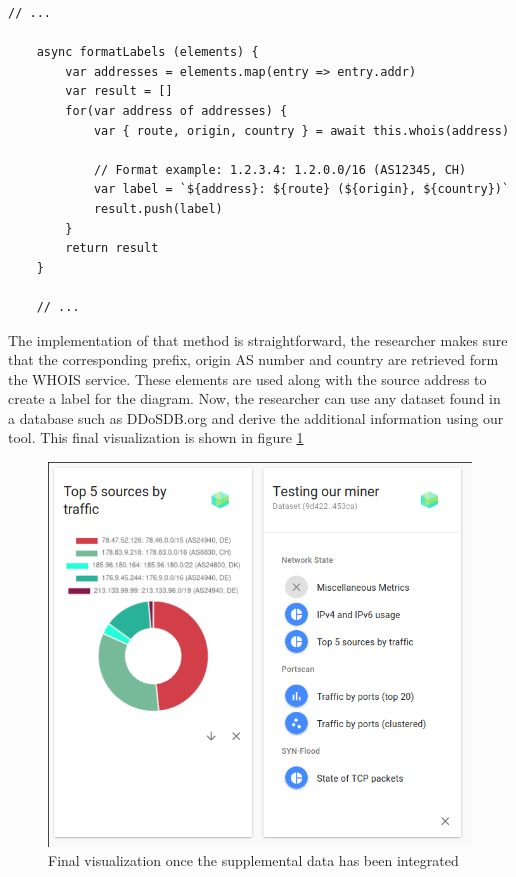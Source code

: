 \begin{lstlisting}[caption={Initial content of the newly create Miner},float=H,label={lst:formatlabels}]
    // ...
    
    async formatLabels (elements) {
        var addresses = elements.map(entry => entry.addr)
        var result = []
        for(var address of addresses) {
            var { route, origin, country } = await this.whois(address)
            
            // Format example: 1.2.3.4: 1.2.0.0/16 (AS12345, CH)
            var label = `${address}: ${route} (${origin}, ${country})`
            result.push(label)
        }
        return result
    }
    
    // ...
\end{lstlisting}
The implementation of that method is straightforward, the researcher makes sure that the corresponding prefix, origin AS number and country are retrieved form the WHOIS service. These elements are used along with the source address to create a label for the diagram.
Now, the researcher can use any dataset found in a database such as DDoSDB.org and derive the additional information using our tool. This final visualization is shown in figure \ref{fig:finalimpl}

\begin{figure}[]
    \centering
    \includegraphics[width=15cm]{images/reseracher-case-study-final.png}
    \caption{Final visualization once the supplemental data has been integrated}
    \label{fig:finalimpl}
\end{figure}

